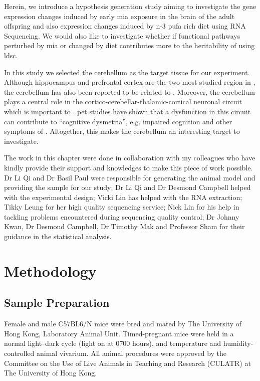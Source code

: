 \documentclass[12pt]{scrbook}
\newcommand*{\glng}{\glsentrylong}
\begin{document}
Herein, we introduce a hypothesis generation study aiming to investigate the gene expression changes induced by early \gls{mia} exposure in the brain of the adult offspring and also expression changes induced by n-3 \gls{pufa} rich diet using RNA Sequencing.
We would also like to investigate whether if functional pathways perturbed by \gls{mia} or changed by diet contributes more to the heritability of \glng{scz} using \gls{ldsc}.

In this study we selected the cerebellum as the target tissue for our experiment. 
Although hippocampus \citep{Velakoulis2006,Nugent2007} and prefrontal cortex \citep{Knable1997,Perlstein2001} are the two most studied region in \glng{scz}, the cerebellum has also been reported to be related to \glng{scz} \citep{Yeganeh-Doost2011,Andreasen2008}.
Moreover, the cerebellum plays a central role in the cortico-cerebellar-thalamic-cortical neuronal circuit which is important to \glng{scz}.
\Gls{pet} studies have shown that a dysfunction in this circuit can contribute to ``cognitive dysmetria'', e.g. impaired cognition and other symptoms of \glng{scz} \citep{Yeganeh-Doost2011}.
Altogether, this makes the cerebellum an interesting target to investigate.

The work in this chapter were done in collaboration with my colleagues who have kindly provide their support and knowledges to make this piece of work possible.
Dr Li Qi and Dr Basil Paul were responsible for generating the animal model and providing the sample for our study;
Dr Li Qi and Dr Desmond Campbell helped with the experimental design;
Vicki Lin has helped with the RNA extraction; 
Tikky Leung for her high quality sequencing service;
Nick Lin for his help in tackling problems encountered during sequencing quality control; 
Dr Johnny Kwan, Dr Desmond Campbell, Dr Timothy Mak and Professor Sham for their guidance in the statistical analysis.

\section{Methodology}
\subsection{Sample Preparation}
Female and male C57BL6/N mice were bred and mated by The University of Hong Kong, Laboratory Animal Unit. 
Timed-pregnant mice were held in a normal light–dark cycle (light on at 0700 hours), and temperature and humidity-controlled animal vivarium. 
All animal procedures were approved by the Committee on the Use of Live Animals in Teaching and Research (CULATR) at The University of Hong Kong.
\end{document}
